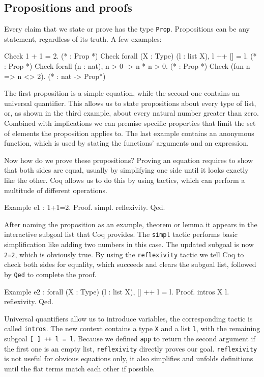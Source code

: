 \documentclass[fleqn, abstract=on]{scrreprt}
\newcommand{\todo}[1]{\marginpar{\textbf{TODO:} #1}}
\newcommand{\coqinline}[1]{\texttt{#1}}
\begin{document}
\subsection{Propositions and proofs}
Every claim that we state or prove has the type \coqinline{Prop}. Propositions can be any statement, regardless of its truth. A few examples:
\begin{coqcode}
Check 1 + 1 = 2. (* : Prop *)
Check forall (X : Type) (l : list X), l ++ [] = l. (* : Prop *)
Check forall (n : nat), n > 0 -> n * n > 0. (* : Prop *)
Check (fun n => n <> 2). (* : nat -> Prop*)
\end{coqcode}
The first proposition is a simple equation, while the second one contains an universal quantifier. This allows us to state propositions about every type of list, or, as shown in the third example, about every natural number greater than zero. Combined with implications we can premise specific properties that limit the set of elements the proposition applies to. The last example contains an anonymous function, which is used by stating the functions' arguments and an expression.
\par
Now how do we prove these propositions? Proving an equation requires to show that both sides are equal, usually by simplifying one side until it looks exactly like the other. Coq allows us to do this by using tactics, which can perform a multitude of different operations.
\begin{coqcode}
Example e1 : 1+1=2.
Proof. simpl. reflexivity. Qed. 
\end{coqcode} 
\todo{Highlighting für Proof und Qed}
After naming the proposition as an example, theorem or lemma it appears in the interactive subgoal list that Coq provides. The \coqinline{simpl} tactic performs basic simplification like adding two numbers in this case. The updated subgoal is now \coqinline{2=2}, which is obviously true. By using the \coqinline{reflexivity} tactic we tell Coq to check both sides for equality, which succeeds and clears the subgoal list, followed by \coqinline{Qed} to complete the proof.
\begin{coqcode}
Example e2 : forall (X : Type) (l : list X), [] ++ l = l.
Proof. intros X l. reflexivity. Qed.
\end{coqcode}
Universal quantifiers allow us to introduce variables, the corresponding tactic is called \coqinline{intros}. The new context contains a type \coqinline{X} and a list \coqinline{l}, with the remaining subgoal \coqinline{[ ] ++ l = l}. Because we defined \coqinline{app} to return the second argument if the first one is an empty list, \coqinline{reflexivity} directly proves our goal. \coqinline{reflexivity} is not useful for obvious equations only, it also simplifies and unfolds definitions until the flat terms match each other if possible.
\end{document}
